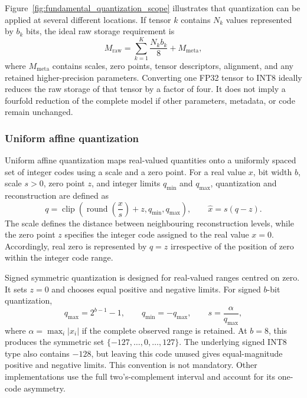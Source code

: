 \documentclass[
    a4paper,
    12pt,
    titlepage,
    bibliography=totoc,
    twoside=on,
    parskip=false,
    numbers=noenddot,
    cleardoublepage=empty,
    DIV=12,
    BCOR=12.0mm,
    headheight=36pt,
    headings=openright
]{scrreprt}
\begin{document}
Figure~\ref{fig:fundamental_quantization_scope} illustrates that quantization can be applied at several different locations. If tensor $k$ contains $N_k$ values represented by $b_k$ bits, the ideal raw storage requirement is
\begin{equation}
    M_{\mathrm{raw}}
    =
    \sum_{k=1}^{K}\frac{N_k b_k}{8}
    +
    M_{\mathrm{meta}},
    \label{eq:fundamental_quantized_storage}
\end{equation}
where $M_{\mathrm{meta}}$ contains scales, zero points, tensor descriptors, alignment, and any retained higher-precision parameters. Converting one FP32 tensor to INT8 ideally reduces the raw storage of that tensor by a factor of four. It does not imply a fourfold reduction of the complete model if other parameters, metadata, or code remain unchanged.

\subsubsection{Uniform affine quantization}

Uniform affine quantization maps real-valued quantities onto a uniformly spaced set of integer codes using a scale and a zero point. For a real value $x$, bit width $b$, scale $s>0$, zero point $z$, and integer limits $q_{\min}$ and $q_{\max}$, quantization and reconstruction are defined as
\begin{equation}
    q=\operatorname{clip}\!\left(
    \operatorname{round}\!\left(\frac{x}{s}\right)+z,
    q_{\min},q_{\max}
    \right),
    \qquad
    \widehat x=s(q-z).
    \label{eq:fundamental_affine_quantization}
\end{equation}
The scale defines the distance between neighbouring reconstruction levels, while the zero point $z$ specifies the integer code assigned to the real value $x=0$. Accordingly, real zero is represented by $q=z$ irrespective of the position of zero within the integer code range.\autocite{jacobQuantizationTrainingNeural2017,nagelWhitePaperNeural2021}

Signed symmetric quantization is designed for real-valued ranges centred on zero. It sets $z=0$ and chooses equal positive and negative limits. For signed $b$-bit quantization,
\begin{equation}
    q_{\max}=2^{b-1}-1,
    \qquad
    q_{\min}=-q_{\max},
    \qquad
    s=\frac{\alpha}{q_{\max}},
    \label{eq:fundamental_symmetric_scale}
\end{equation}
where $\alpha=\max_i|x_i|$ if the complete observed range is retained. At $b=8$, this produces the symmetric set $\{-127,\ldots,0,\ldots,127\}$. The underlying signed INT8 type also contains $-128$, but leaving this code unused gives equal-magnitude positive and negative limits. This convention is not mandatory. Other implementations use the full two's-complement interval and account for its one-code asymmetry.
\end{document}
